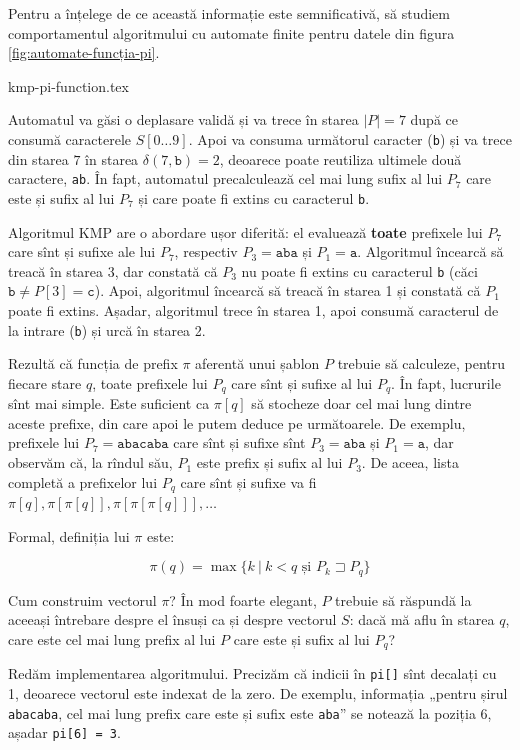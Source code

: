 \documentclass[../main.tex]{subfiles}
\begin{document}
Pentru a înțelege de ce această informație este semnificativă, să studiem
comportamentul algoritmului cu automate finite pentru datele din figura
\ref{fig:automate-funcția-pi}.

{kmp-pi-function.tex}

Automatul va găsi o deplasare validă și va trece în starea $|P| = 7$ după ce
consumă caracterele $S[0 \dots 9]$. Apoi va consuma următorul caracter
(\texttt{b}) și va trece din starea $7$ în starea $\delta(7, \texttt{b}) = 2$,
deoarece poate reutiliza ultimele două caractere, \texttt{ab}. În fapt,
automatul precalculează cel mai lung sufix al lui $P_7$ care este și sufix al
lui $P_7$ și care poate fi extins cu caracterul \texttt{b}.

Algoritmul KMP are o abordare ușor diferită: el evaluează \textbf{toate}
prefixele lui $P_7$ care sînt și sufixe ale lui $P_7$, respectiv $P_3 =
\texttt{aba}$ și $P_1 = \texttt{a}$. Algoritmul încearcă să treacă în starea
3, dar constată că $P_3$ nu poate fi extins cu caracterul \texttt{b} (căci
$\texttt{b} \neq P[3] = \texttt{c}$). Apoi, algoritmul încearcă să treacă în
starea 1 și constată că $P_1$ poate fi extins. Așadar, algoritmul trece în
starea 1, apoi consumă caracterul de la intrare (\texttt{b}) și urcă în starea
2.

Rezultă că funcția de prefix $\pi$ aferentă unui șablon $P$ trebuie să
calculeze, pentru fiecare stare $q$, toate prefixele lui $P_q$ care sînt și
sufixe al lui $P_q$. În fapt, lucrurile sînt mai simple. Este suficient ca
$\pi[q]$ să stocheze doar cel mai lung dintre aceste prefixe, din care apoi le
putem deduce pe următoarele. De exemplu, prefixele lui $P_7 =
\texttt{abacaba}$ care sînt și sufixe sînt $P_3 = \texttt{aba}$ și $P_1 =
\texttt{a}$, dar observăm că, la rîndul său, $P_1$ este prefix și sufix al lui
$P_3$. De aceea, lista completă a prefixelor lui $P_q$ care sînt și sufixe va
fi $\pi[q], \pi[\pi[q]], \pi[\pi[\pi[q]]], \dots$

Formal, definiția lui $\pi$ este:

$$\pi(q) = \max \{ k\ |\ k < q \textrm{ și } P_k \sqsupset P_q \}$$

Cum construim vectorul $\pi$? În mod foarte elegant, $P$ trebuie să răspundă
la aceeași întrebare despre el însuși ca și despre vectorul $S$: dacă mă aflu
în starea $q$, care este cel mai lung prefix al lui $P$ care este și sufix al
lui $P_q$?

Redăm implementarea algoritmului. Precizăm că indicii în \texttt{pi[]}
sînt decalați cu 1, deoarece vectorul este indexat de la zero. De exemplu,
informația „pentru șirul \texttt{abacaba}, cel mai lung prefix care este și
sufix este \texttt{aba}” se notează la poziția 6, așadar
\texttt{pi[6] = 3}.
\end{document}

